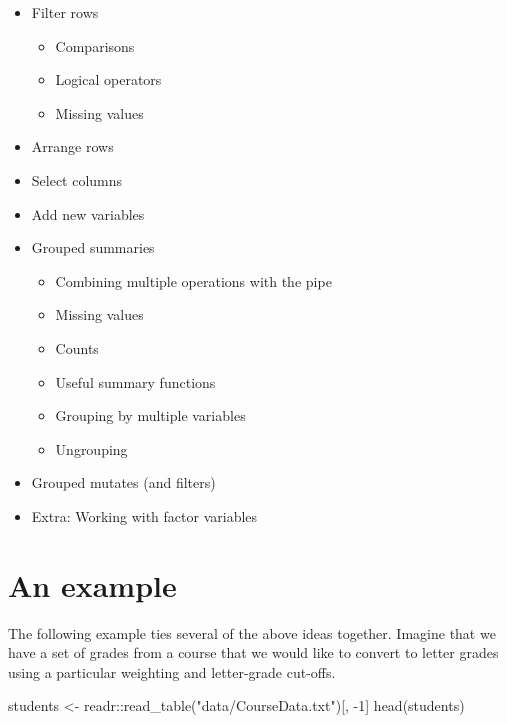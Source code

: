 \documentclass[
]{book}
\newenvironment{Shaded}{\begin{snugshade}}{\end{snugshade}}
\newcommand{\DecValTok}[1]{\textcolor[rgb]{0.00,0.00,0.81}{#1}}
\newcommand{\FunctionTok}[1]{\textcolor[rgb]{0.00,0.00,0.00}{#1}}
\newcommand{\NormalTok}[1]{#1}
\newcommand{\OtherTok}[1]{\textcolor[rgb]{0.56,0.35,0.01}{#1}}
\newcommand{\SpecialCharTok}[1]{\textcolor[rgb]{0.00,0.00,0.00}{#1}}
\newcommand{\StringTok}[1]{\textcolor[rgb]{0.31,0.60,0.02}{#1}}
\providecommand{\tightlist}{%
  \setlength{\itemsep}{0pt}\setlength{\parskip}{0pt}}
\begin{document}
\begin{itemize}
\tightlist
\item
  Filter rows

  \begin{itemize}
  \tightlist
  \item
    Comparisons
  \item
    Logical operators
  \item
    Missing values
  \end{itemize}
\item
  Arrange rows
\item
  Select columns
\item
  Add new variables
\item
  Grouped summaries

  \begin{itemize}
  \tightlist
  \item
    Combining multiple operations with the pipe
  \item
    Missing values
  \item
    Counts
  \item
    Useful summary functions
  \item
    Grouping by multiple variables
  \item
    Ungrouping
  \end{itemize}
\item
  Grouped mutates (and filters)
\item
  Extra: Working with factor variables
\end{itemize}

\hypertarget{an-example-1}{%
\section{An example}\label{an-example-1}}

The following example ties several of the above ideas together. Imagine that we have a set of grades from a course that we would like to convert to letter grades using a particular weighting and letter-grade cut-offs.

\begin{Shaded}
\begin{Highlighting}[]
\NormalTok{students }\OtherTok{\textless{}{-}}\NormalTok{ readr}\SpecialCharTok{::}\FunctionTok{read\_table}\NormalTok{(}\StringTok{"data/CourseData.txt"}\NormalTok{)[, }\SpecialCharTok{{-}}\DecValTok{1}\NormalTok{]}
\FunctionTok{head}\NormalTok{(students)}
\end{Highlighting}
\end{Shaded}
\end{document}
